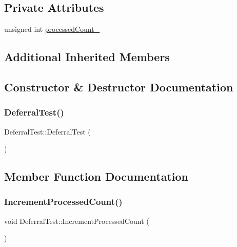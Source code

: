 \subsection*{Private Attributes}
\begin{DoxyCompactItemize}
\item 
unsigned int \mbox{\hyperlink{struct_deferral_test_afbc3997824b7be76460443e3a9f9bde2}{processed\+Count\+\_\+}}
\end{DoxyCompactItemize}
\subsection*{Additional Inherited Members}


\subsection{Constructor \& Destructor Documentation}
\mbox{\label{struct_deferral_test_a6b0e30c5556fe51fe6b03fc87db74309}} 
\subsubsection{\texorpdfstring{Deferral\+Test()}{DeferralTest()}}
{\footnotesize\ttfamily Deferral\+Test\+::\+Deferral\+Test (\begin{DoxyParamCaption}{ }\end{DoxyParamCaption})\hspace{0.3cm}{\ttfamily [inline]}}



\subsection{Member Function Documentation}
\mbox{\label{struct_deferral_test_af119a5eeb135653bc5d30da46df856b9}} 
\subsubsection{\texorpdfstring{Increment\+Processed\+Count()}{IncrementProcessedCount()}}
{\footnotesize\ttfamily void Deferral\+Test\+::\+Increment\+Processed\+Count (\begin{DoxyParamCaption}{ }\end{DoxyParamCaption})\hspace{0.3cm}{\ttfamily [inline]}}

